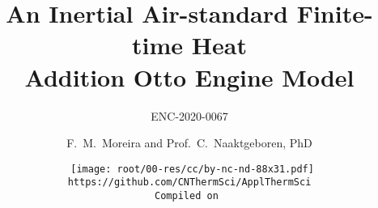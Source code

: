 \makeatletter
\immediate{} %
\makeatother



\newcommand{\VPMS}{{\ensuremath V_{\mathrm{PMS}}}}
\newcommand{\VPMI}{{\ensuremath V_{\mathrm{PMI}}}}
\newcommand{\bsans}[1]{{\ensuremath\pmb{\mathsf{#1}}}}
\newcommand{\RED}[1]{{\textcolor{red}{#1}}}
\newcommand{\ORA}[1]{{\textcolor{orange}{#1}}}
\title{An Inertial Air-standard Finite-time Heat\\ Addition Otto Engine Model}
\subtitle{ENC-2020-0067}
\author{F.~M.~Moreira and Prof.~C.~Naaktgeboren, PhD}
\date{{\scriptsize\tt%
    \texttt{[image: root/00-res/cc/by-nc-nd-88x31.pdf]}\\[\smallskipamount]
    https://github.com/CNThermSci/ApplThermSci\\
    Compiled on 
}}

\frame{\titlepage}
\frame{\tableofcontents}


